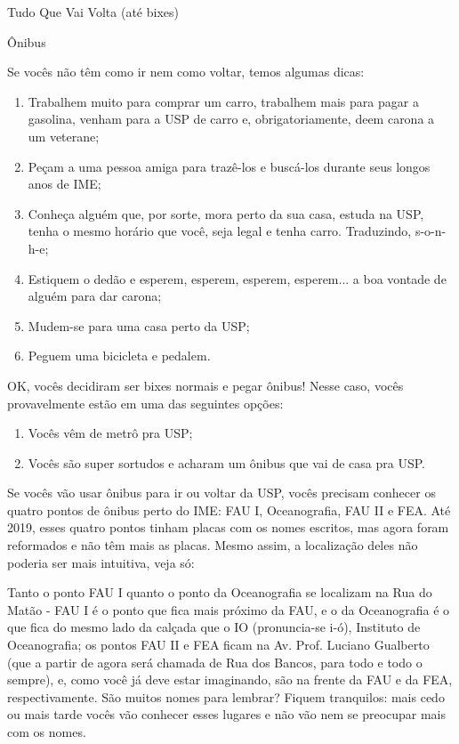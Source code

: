 \begin{secao}{Tudo Que Vai Volta (até bixes)}

\begin{subsecao}{Ônibus}

Se vocês não têm como ir nem como voltar, temos algumas dicas:

\begin{enumerate}
\vspace{-15pt}
  \item Trabalhem muito para comprar um carro,
  trabalhem mais para pagar a gasolina,
  venham para a USP de carro e, obrigatoriamente, deem carona a um veterane;

  \item Peçam a uma pessoa amiga para trazê-los e buscá-los durante seus
  longos anos de IME;

  \item Conheça alguém que, por sorte, mora perto da sua casa, estuda na USP,
  tenha o mesmo horário que você, seja legal e tenha carro. Traduzindo, s-o-n-h-e;

  \item Estiquem o dedão e esperem, esperem, esperem, esperem... a boa vontade
  de alguém para dar carona;

  \item Mudem-se para uma casa perto da USP;

  \item Peguem uma bicicleta e pedalem.

\end{enumerate}
\vspace{-15pt}
OK, vocês decidiram ser bixes normais e pegar ônibus! Nesse caso, vocês
provavelmente estão em uma das seguintes opções:
\vspace{-15pt}
\begin{enumerate}
  \item Vocês vêm de metrô pra USP;
  \item Vocês são super sortudos e acharam um ônibus que vai de casa pra USP.
\end{enumerate}
\vspace{-15pt}
Se vocês vão usar ônibus para ir ou voltar da USP, vocês precisam conhecer
os quatro pontos de ônibus perto do IME: FAU I, Oceanografia, FAU II e FEA.
Até 2019, esses quatro pontos tinham placas com os nomes escritos, mas
agora foram reformados e não têm mais as placas. Mesmo assim, a localização deles
não poderia ser mais intuitiva, veja só:

Tanto o ponto FAU I quanto o ponto da Oceanografia se localizam na Rua do
Matão - FAU I é o ponto que fica mais próximo da FAU, e o da Oceanografia é o
que fica do mesmo lado da calçada que o IO (pronuncia-se i-ó), Instituto de
Oceanografia; os pontos FAU II e FEA ficam na Av. Prof. Luciano Gualberto (que a
partir de agora será chamada de Rua dos Bancos, para todo e todo o sempre),
e, como você já deve estar imaginando, são na frente da FAU e da FEA,
respectivamente. São muitos nomes para lembrar? Fiquem tranquilos: mais
cedo ou mais tarde vocês vão conhecer esses lugares e não vão nem se preocupar
mais com os nomes.



\end{subsecao}
\end{secao}
